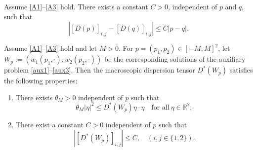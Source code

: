 \documentclass[10pt,a4paper]{amsart}
\begin{document}
\begin{lemma}\label{L3}
    {Assume \ref{A1}--\ref{A3}} hold.
    There exists a constant $C>0$, independent of $p$ and $q$, such that 
 \begin{equation*}
     |[\overline{D}(p)]_{i,j}-[\overline{D}(q)]_{i,j}|\leq C |p-q|.
 \end{equation*}
\end{lemma}

\begin{lemma}\label{L2}
{Assume \ref{A1}--\ref{A3}} hold and let $M>0$.
For $p=(p_1,p_2)\in [-M,M]^2$, let $W_p:=(w_1(p_1,\cdot ),w_2(p_2,\cdot ))$ be the corresponding solutions of the auxiliary problem \eqref{aux1}--\eqref{aux3}. Then the macroscopic dispersion tensor $D^*(W_p)$ satisfies the following properties:
\begin{enumerate}[label=(\roman*)]
    \item There exists $\theta_M>0$ independent of $p$ such that 
         \begin{equation}\label{L2e1}
             \theta_M|\eta |^{2} \leq
             D^*(W_p)\eta \cdot \eta\quad \text{for all}\ \eta\in \mathbb{R}^2;
          \end{equation}

    \item There exist a constant $C>0$ independent of $p$ such that
         \begin{equation}\label{L2e2}
            | [D^*(W_p)]_{i,j}|\leq C,\quad (i,j\in\{1,2\}).
         \end{equation}
\end{enumerate}
\end{lemma}
\end{document}
